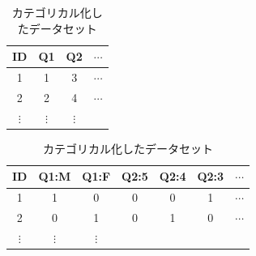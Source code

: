 \begin{table}[ht]
	\begin{minipage}[t]{.30\textwidth}
		\begin{center}
			\caption{一般的なデータセット}
			\begin{tabular}{cccc}
				ID       & Q1       & Q2       & $\cdots$ \\\hline
				1        & 1        & 3        & $\cdots$ \\
				2        & 2        & 4        & $\cdots$ \\
				$\vdots$ & $\vdots$ & $\vdots$ &          \\\hline
			\end{tabular}
		\end{center}
		\label{tbl::14_04}
	\end{minipage}
	\hfill
	\begin{minipage}[t]{.60\textwidth}
		\begin{center}
			\caption{カテゴリカル化したデータセット}
			\begin{tabular}{ccccccc}
				ID       & Q1:M      & Q1:F     & Q2:5 & Q2:4 & Q2:3 & $\cdots$ \\\hline
				1        & 1         & 0        & 0    & 0    & 1    & $\cdots$ \\
				2        & 0         & 1        & 0    & 1    & 0    & $\cdots$ \\
				$\vdots$ & $\vdots $ & $\vdots$ &                               \\\hline
			\end{tabular}
		\end{center}
		\label{tbl::14_05}
	\end{minipage}
\end{table}
